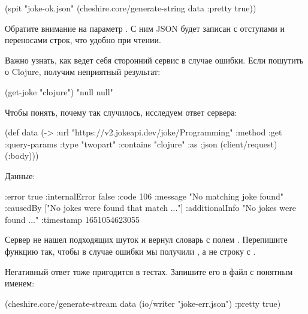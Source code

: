 \begin{english}
  \begin{clojure/lines}
(spit "joke-ok.json"
      (cheshire.core/generate-string
       data {:pretty true}))
  \end{clojure/lines}
\end{english}

Обратите внимание на параметр  . С ним JSON будет записан с отступами и переносами строк, что удобно при чтении.

Важно узнать, как ведет себя сторонний сервис в случае ошибки. Если пошутить о Clojure, получим неприятный результат:

\begin{english}
  \begin{clojure}
(get-joke "clojure")
"null null"
  \end{clojure}
\end{english}

Чтобы понять, почему так случилось, исследуем ответ сервера:

\begin{english}
  \begin{clojure}
(def data
  (-> {:url "https://v2.jokeapi.dev/joke/Programming"
       :method :get
       :query-params {:type "twopart" :contains "clojure"}
       :as :json}
      (client/request)
      (:body)))
  \end{clojure}
\end{english}

Данные:

\begin{english}
  \begin{clojure}
{:error true
 :internalError false
 :code 106
 :message "No matching joke found"
 :causedBy ["No jokes were found that match ..."]
 :additionalInfo "No jokes were found ..."
 :timestamp 1651054623055}
  \end{clojure}
\end{english}

Сервер не нашел подходящих шуток и вернул словарь с полем . Перепишите функцию так, чтобы в случае ошибки мы получили , а не строку с .

Негативный ответ тоже пригодится в тестах. Запишите его в файл с понятным именем:

\begin{english}
  \begin{clojure}
(cheshire.core/generate-stream
  data
  (io/writer "joke-err.json")
  {:pretty true})
  \end{clojure}
\end{english}

